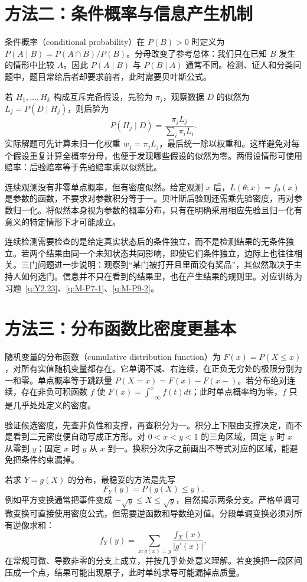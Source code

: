 \documentclass[UTF8,12pt,a4paper,fontset=fandol]{ctexart}
\begin{document}
\section*{方法二：条件概率与信息产生机制}
条件概率（conditional probability）在 $P(B)>0$ 时定义为 $P(A\mid B)=P(A\cap B)/P(B)$。分母改变了参考总体：我们只在已知 $B$ 发生的情形中比较 $A$。因此 $P(A\mid B)$ 与 $P(B\mid A)$ 通常不同。检测、证人和分类问题中，题目常给后者却要求前者，此时需要贝叶斯公式。

若 $H_1,\ldots,H_k$ 构成互斥完备假设，先验为 $\pi_j$，观察数据 $D$ 的似然为 $L_j=P(D\mid H_j)$，则后验为
\[
P(H_j\mid D)=\frac{\pi_jL_j}{\sum_i\pi_iL_i}.
\]
实际解题可先计算未归一化权重 $w_j=\pi_jL_j$，最后统一除以权重和。这样避免对每个假设重复计算全概率分母，也便于发现哪些假设的似然为零。两假设情形可使用赔率：后验赔率等于先验赔率乘以似然比。

连续观测没有非零单点概率，但有密度似然。给定观测 $x$ 后，$L(\theta;x)=f_\theta(x)$ 是参数的函数，不要求对参数积分等于一。贝叶斯后验则还需乘先验密度，再对参数归一化。将似然本身视为参数的概率分布，只有在明确采用相应先验且归一化有意义的特定情形下才可能成立。

连续检测需要检查的是给定真实状态后的条件独立，而不是检测结果的无条件独立。若两个结果由同一个未知状态共同影响，即使它们条件独立，边际上也往往相关。三门问题进一步说明：观察到“某门被打开且里面没有奖品”，其似然取决于主持人如何选门。信息并不只在看到的结果里，也在产生结果的规则里。对应训练为习题~\ref{q:Y2.23}、\ref{q:M-P7-1}、\ref{q:M-P9-2}。

\section*{方法三：分布函数比密度更基本}
随机变量的分布函数（cumulative distribution function）为 $F(x)=P(X\le x)$，对所有实值随机变量都存在。它单调不减、右连续，在正负无穷处的极限分别为一和零。单点概率等于跳跃量 $P(X=x)=F(x)-F(x-)$。若分布绝对连续，存在非负可积函数 $f$ 使 $F(x)=\int_{-\infty}^xf(t)dt$；此时单点概率均为零，$f$ 只是几乎处处定义的密度。

验证候选密度，先查非负性和支撑，再查积分为一。积分上下限由支撑决定，而不是看到二元密度便自动写成正方形。对 $0<x<y<1$ 的三角区域，固定 $y$ 时 $x$ 从零到 $y$；固定 $x$ 时 $y$ 从 $x$ 到一。换积分次序之前画出不等式对应的区域，能避免把条件约束漏掉。

若求 $Y=g(X)$ 的分布，最稳妥的方法是先写
\[
F_Y(y)=P(g(X)\le y).
\]
例如平方变换通常把事件变成 $-\sqrt y\le X\le\sqrt y$，自然揭示两条分支。严格单调可微变换可直接使用密度公式，但需要逆函数和导数绝对值。分段单调变换必须对所有逆像求和：
\[
f_Y(y)=\sum_{x:g(x)=y}\frac{f_X(x)}{|g'(x)|},
\]
在常规可微、导数非零的分支上成立，并按几乎处处意义理解。若变换把一段区间压成一个点，结果可能出现原子，此时单纯求导可能漏掉点质量。
\end{document}
